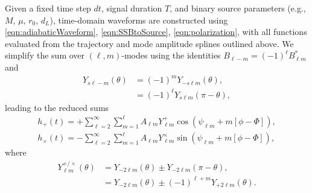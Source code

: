 \documentclass[%
 reprint,
 nofootinbib,
 amsmath,amssymb,
 aps,
 prd,
]{revtex4-2}
\begin{document}
Given a fixed time step $dt$, signal duration $T$, and binary source parameters (e.g., $M$, $\mu$, $r_0$, $d_L$), time-domain waveforms are constructed using \eqref{eqn:adiabaticWaveform}, \eqref{eqn:SSBtoSource}, \eqref{eqn:polarization}, with all functions evaluated from the trajectory and mode amplitude splines outlined above. We simplify the sum over $(\ell, m)$-modes using the identities $B_{\ell -m} = (-1)^\ell B^*_{\ell m}$ and
\begin{subequations}
    \begin{align}
    Y_{s\ell -m}(\theta) &= (-1)^{m} Y_{-s \ell m}(\theta),
    \\
    &= (-1)^{\ell} Y_{s \ell m}(\pi-\theta),
    \end{align}
\end{subequations}
leading to the reduced sums
\begin{subequations} \label{eqn:timeDomainReduced}
    \begin{align}
    h_+(t) = +\sum_{\ell=2}^\infty \sum_{ m = 1}^{\ell} A_{\ell m} Y^+_{\ell m} \cos(\psi_{\ell m} + m[\phi - \Phi]),
    \\
    h_\times(t) = -\sum_{\ell=2}^\infty \sum_{ m = 1}^{\ell}  A_{\ell m} Y^\times_{\ell m} \sin(\psi_{\ell m} + m[\phi - \Phi]),
\end{align}
\end{subequations}
where
\begin{subequations}
    \begin{align}
    Y^{+/\times}_{\ell m}(\theta) &= Y_{-2\ell m}(\theta) \pm Y_{-2\ell m}(\pi - \theta),
    \\
    &= Y_{-2\ell m}(\theta) \pm (-1)^{\ell + m} Y_{+2\ell m}(\theta).
    \end{align}
\end{subequations}
\end{document}
